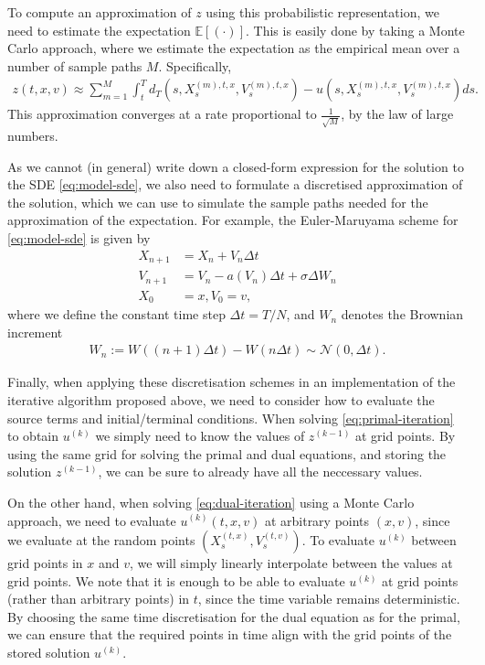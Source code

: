 \documentclass{article}  %
\begin{document}
To compute an approximation of $z$ using this probabilistic representation, we need to estimate the expectation $\mathbb{E}[(\cdot)]$. This is easily done by taking a Monte Carlo approach, where we estimate the expectation as the empirical mean over a number of sample paths $M$. Specifically,
%
\begin{align}
    \label{eq:dual-mc-approx}
    z(t,x,v) \approx \sum_{m=1}^{M} \int_t^T d_T(s,X_s^{(m),t,x},V_s^{(m),t,x}) - u(s,X_s^{(m),t,x},V_s^{(m),t,x}) ds . 
\end{align}
%
This approximation converges at a rate proportional to $\frac{1}{\sqrt{M}}$, by the law of large numbers. 

As we cannot (in general) write down a closed-form expression for the solution to the SDE \autoref{eq:model-sde}, we also need to formulate a discretised approximation of the solution, which we can use to simulate the sample paths needed for the approximation of the expectation. For example, the Euler-Maruyama scheme for \autoref{eq:model-sde} is given by
%
\begin{align}
    X_{n+1} &= X_n + V_n \Delta t \\
    V_{n+1} &= V_n - a(V_n)\Delta t + \sigma \Delta W_n \\
    X_0 &= x, V_0 = v,
\end{align}
%
where we define the constant time step $\Delta t = T/N$, and $W_n$ denotes the Brownian increment
%
\begin{align} 
    W_n := W((n+1)\Delta t) - W(n\Delta t) \sim \mathcal{N}(0,\Delta t).
\end{align}
%

Finally, when applying these discretisation schemes in an implementation of the iterative algorithm proposed above, we need to consider how to evaluate the source terms and initial/terminal conditions. When solving \autoref{eq:primal-iteration} to obtain $u^{(k)}$ we simply need to know the values of $z^{(k-1)}$ at grid points. By using the same grid for solving the primal and dual equations, and storing the solution $z^{(k-1)}$, we can be sure to already have all the neccessary values.

On the other hand, when solving \autoref{eq:dual-iteration} using a Monte Carlo approach, we need to evaluate $u^{(k)}(t,x,v)$ at arbitrary points $(x,v)$, since we evaluate at the random points $(X_s^{(t,x)},V_s^{(t,v)})$. To evaluate $u^{(k)}$ between grid points in $x$ and $v$, we will simply linearly interpolate between the values at grid points.
We note that it is enough to be able to evaluate $u^{(k)}$ at grid points (rather than arbitrary points) in $t$, since the time variable remains deterministic. By choosing the same time discretisation for the dual equation as for the primal, we can ensure that the required points in time align with the grid points of the stored solution $u^{(k)}$. 
\end{document}
